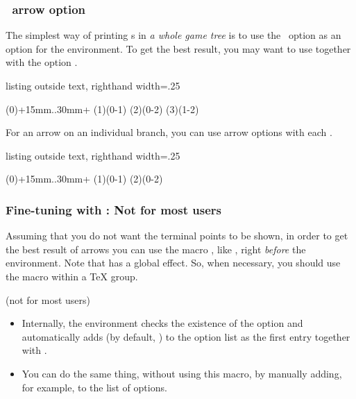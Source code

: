 \subsubsection{\TikZ\ arrow option \xw{->}}

The simplest way of printing s in \emph{a whole game tree} is to use the \Tikz\ option \xw{->} as an option for the  environment. To get the best result, you may want to use \cmd{\xtShowEndPoints} together with the option \xw{->}.

\begin{tcblisting}{listing outside text, righthand width=.25\linewidth}
\begin{istgame}[->,scale=.8]
\istroot(0)+15mm..30mm+  \istb \istb \endist
\xtShowEndPoints
\istroot(1)(0-1)         \istb \istb \endist
\istroot(2)(0-2)         \istb \istb \endist
\istroot(3)(1-2)         \istb \istb \endist
\end{istgame}
\end{tcblisting}

For an arrow on an individual branch, you can use arrow options with each \cmd{\istb}.

\begin{tcblisting}{listing outside text, righthand width=.25\linewidth}
\begin{istgame}[scale=.8]
\istroot(0)+15mm..30mm+  \istb[->] \istb \endist
\xtShowEndPoints
\istroot(1)(0-1) \istb[->] \istb \endist
\xtHideEndPoints
\istroot(2)(0-2) \istb[-|<>|] \istb[->o>>>o>] \endist
\end{istgame}
\end{tcblisting}


\subsubsection{Fine-tuning with \protect\cmd{\setistgameshorten}: Not for most users}
\label{sec:setistgamearrowendshorten}
Assuming that you do not want the terminal points to be shown, in order to get the best result of arrows you can use the macro \icmd{\setistgameshorten},
like \cmd{\setistgameshorten\{1.3pt\}}, right \emph{before} the  environment.
Note that \cmd{\setistgameshorten} has a global effect. So, when necessary, you should use the macro within a TeX group.

\remark (not for most users)
\begin{itemize}\tightlist
\item Internally, the  environment checks the existence of the option \xw{->} and automatically adds  (by default, \xw{0pt}) to the option list as the first entry together with \xw{->}.
\item You can do the same thing, without using this macro, by manually adding, for example, \xw{[->,shorten >=1.3pt]} to the list of options.
\end{itemize}

